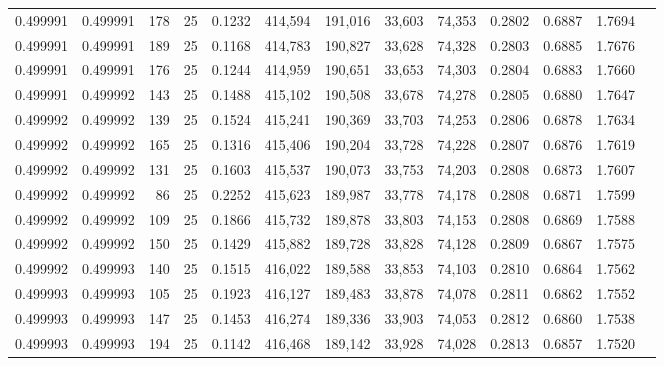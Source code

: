 \begin{tabular}{rrrrrrrrrrrrr}
0.499991 & 0.499991 &   178 &  25 &                                     0.1232 & 414,594 & 191,016 &  33,603 &  74,353 & 0.2802 & 0.6887 & 1.7694 \\
0.499991 & 0.499991 &   189 &  25 &                                     0.1168 & 414,783 & 190,827 &  33,628 &  74,328 & 0.2803 & 0.6885 & 1.7676 \\
0.499991 & 0.499991 &   176 &  25 &                                     0.1244 & 414,959 & 190,651 &  33,653 &  74,303 & 0.2804 & 0.6883 & 1.7660 \\
0.499991 & 0.499992 &   143 &  25 &                                     0.1488 & 415,102 & 190,508 &  33,678 &  74,278 & 0.2805 & 0.6880 & 1.7647 \\
0.499992 & 0.499992 &   139 &  25 &                                     0.1524 & 415,241 & 190,369 &  33,703 &  74,253 & 0.2806 & 0.6878 & 1.7634 \\
0.499992 & 0.499992 &   165 &  25 &                                     0.1316 & 415,406 & 190,204 &  33,728 &  74,228 & 0.2807 & 0.6876 & 1.7619 \\
0.499992 & 0.499992 &   131 &  25 &                                     0.1603 & 415,537 & 190,073 &  33,753 &  74,203 & 0.2808 & 0.6873 & 1.7607 \\
0.499992 & 0.499992 &    86 &  25 &                                     0.2252 & 415,623 & 189,987 &  33,778 &  74,178 & 0.2808 & 0.6871 & 1.7599 \\
0.499992 & 0.499992 &   109 &  25 &                                     0.1866 & 415,732 & 189,878 &  33,803 &  74,153 & 0.2808 & 0.6869 & 1.7588 \\
0.499992 & 0.499992 &   150 &  25 &                                     0.1429 & 415,882 & 189,728 &  33,828 &  74,128 & 0.2809 & 0.6867 & 1.7575 \\
0.499992 & 0.499993 &   140 &  25 &                                     0.1515 & 416,022 & 189,588 &  33,853 &  74,103 & 0.2810 & 0.6864 & 1.7562 \\
0.499993 & 0.499993 &   105 &  25 &                                     0.1923 & 416,127 & 189,483 &  33,878 &  74,078 & 0.2811 & 0.6862 & 1.7552 \\
0.499993 & 0.499993 &   147 &  25 &                                     0.1453 & 416,274 & 189,336 &  33,903 &  74,053 & 0.2812 & 0.6860 & 1.7538 \\
0.499993 & 0.499993 &   194 &  25 &                                     0.1142 & 416,468 & 189,142 &  33,928 &  74,028 & 0.2813 & 0.6857 & 1.7520 \\

\end{tabular}
